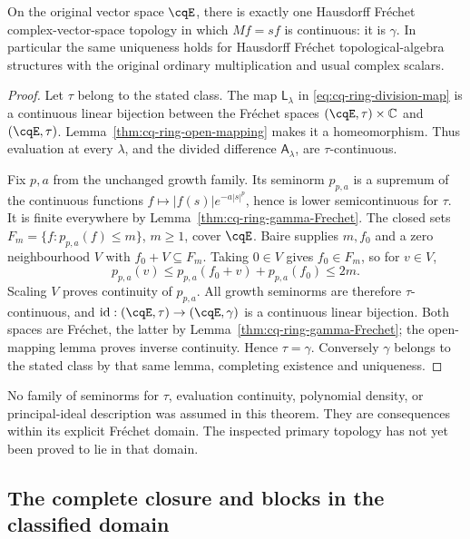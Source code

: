 \begin{cqtheorem}
\label{thm:cq-ring-Frechet-rigidity}
On the original vector space $\cqE$, there is exactly one
Hausdorff Fr\'echet complex-vector-space topology in which
$Mf=sf$ is continuous: it is $\gamma$.
In particular the same uniqueness holds for Hausdorff
Fr\'echet topological-algebra structures with the original
ordinary multiplication and usual complex scalars.
\end{cqtheorem}
\begin{proof}
Let $\tau$ belong to the stated class. The map
$\mathsf L_\lambda$ in \eqref{eq:cq-ring-division-map} is a
continuous linear bijection between the Fr\'echet spaces
$(\cqE,\tau)\times\mathbb C$ and $(\cqE,\tau)$.
Lemma~\ref{thm:cq-ring-open-mapping} makes it a homeomorphism.
Thus evaluation at every $\lambda$, and the divided
difference $\mathsf A_\lambda$, are $\tau$-continuous.

Fix $p,a$ from the unchanged growth family. Its seminorm
$p_{p,a}$ is a supremum of the continuous functions
$f\mapsto|f(s)|e^{-a|s|^p}$, hence is lower semicontinuous
for $\tau$. It is finite everywhere by
Lemma~\ref{thm:cq-ring-gamma-Frechet}. The closed sets
$F_m=\{f:p_{p,a}(f)\leq m\}$, $m\geq1$, cover $\cqE$.
Baire supplies $m,f_0$ and a zero neighbourhood $V$ with
$f_0+V\subseteq F_m$. Taking $0\in V$ gives $f_0\in F_m$,
so for $v\in V$,
\[
 p_{p,a}(v)\leq p_{p,a}(f_0+v)+p_{p,a}(f_0)\leq2m.
\]
Scaling $V$ proves continuity of $p_{p,a}$. All growth
seminorms are therefore $\tau$-continuous, and
$\mathrm{id}:(\cqE,\tau)\to(\cqE,\gamma)$ is a continuous
linear bijection. Both spaces are Fr\'echet, the latter by
Lemma~\ref{thm:cq-ring-gamma-Frechet}; the open-mapping
lemma proves inverse continuity. Hence $\tau=\gamma$.
Conversely $\gamma$ belongs to the stated class by that
same lemma, completing existence and uniqueness.
\end{proof}

No family of seminorms for $\tau$, evaluation continuity,
polynomial density, or principal-ideal description was
assumed in this theorem. They are consequences within its
explicit Fr\'echet domain. The inspected primary topology
has not yet been proved to lie in that domain.

\subsection{The complete closure and blocks in the classified domain}

